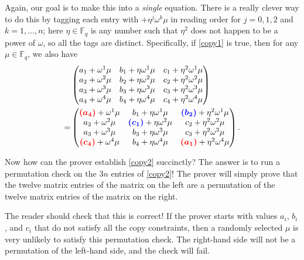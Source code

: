 \documentclass{article}
\newcommand{\redoval}[1]{\textcolor{red}{\boldsymbol{#1}}}
\newcommand{\bluerect}[1]{\textcolor{blue}{\boldsymbol{#1}}}
\begin{document}
Again, our goal is to make this into a \emph{single} equation. There is
a really clever way to do this by tagging each entry with
\(+ \eta^{j}\omega^{k}\mu\) in reading order for \(j = 0,1,2\) and
\(k = 1,\ldots,n\); here \(\eta \in {\mathbb{F}}_{q}\) is any number
such that \(\eta^{2}\) does not happen to be a power of \(\omega\), so
all the tags are distinct. Specifically, if
\hyperref[copy1]{{[}copy1{]}} is true, then for any
\(\mu \in {\mathbb{F}}_{q}\), we also have \[\begin{aligned}
 & \begin{pmatrix}
a_{1} + \omega^{1}\mu & b_{1} + \eta\omega^{1}\mu & c_{1} + \eta^{2}\omega^{1}\mu \\
a_{2} + \omega^{2}\mu & b_{2} + \eta\omega^{2}\mu & c_{2} + \eta^{2}\omega^{2}\mu \\
a_{3} + \omega^{3}\mu & b_{3} + \eta\omega^{3}\mu & c_{3} + \eta^{2}\omega^{3}\mu \\
a_{4} + \omega^{4}\mu & b_{4} + \eta\omega^{4}\mu & c_{4} + \eta^{2}\omega^{4}\mu
\end{pmatrix} \\
 = & \begin{pmatrix}
\redoval{(a_{4})} + \omega^{1}\mu & b_{1} + \eta\omega^{1}\mu & \bluerect{(b_{2})} + \eta^{2}\omega^{1}\mu \\
a_{2} + \omega^{2}\mu & \bluerect{(c_{1})} + \eta\omega^{2}\mu & c_{2} + \eta^{2}\omega^{2}\mu \\
a_{3} + \omega^{3}\mu & b_{3} + \eta\omega^{3}\mu & c_{3} + \eta^{2}\omega^{3}\mu \\
\redoval{(c_{4})} + \omega^{4}\mu & b_{4} + \eta\omega^{4}\mu & \redoval{(a_{1})} + \eta^{2}\omega^{4}\mu
\end{pmatrix}.
\end{aligned}\] \label{copy2}{}

Now how can the prover establish \hyperref[copy2]{{[}copy2{]}}
succinctly? The answer is to run a permutation check on the \(3n\)
entries of \hyperref[copy2]{{[}copy2{]}}! The prover will simply prove
that the twelve matrix entries of the matrix on the left are a
permutation of the twelve matrix entries of the matrix on the right.

The reader should check that this is correct! If the prover starts with
values \(a_{i}\), \(b_{i}\), and \(c_{i}\) that do not satisfy all the
copy constraints, then a randomly selected \(\mu\) is very unlikely to
satisfy this permutation check. The right-hand side will not be a
permutation of the left-hand side, and the check will fail.
\end{document}
